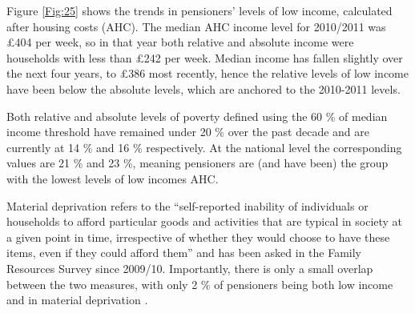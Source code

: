 \documentclass[11 pt, a4paper]{report}
\begin{document}
Figure \ref{Fig:25} shows the trends in pensioners' levels of low income, calculated after housing costs (AHC). The median AHC income level for 2010/2011 was \pounds 404 per week, so in that year both relative and absolute income were households with less than \pounds 242 per week. Median income has fallen slightly over the next four years, to \pounds 386 most recently, hence the relative levels of low income have been below the absolute levels, which are anchored to the 2010-2011 levels. 

Both relative and absolute levels of poverty defined using the 60 \% of median income threshold have remained under 20 \% over the past decade and are currently at 14 \% and 16 \% respectively. At the national level the corresponding values are 21 \% and 23 \%, meaning pensioners are (and have been) the group with the lowest levels of low incomes AHC. 

Material deprivation refers to the ``self-reported inability of individuals or households to afford
particular goods and activities that are typical in society at a given point in
time, irrespective of whether they would choose to have these items, even if
they could afford them'' and has been asked in the Family Resources Survey since 2009/10. Importantly, there is only a small overlap between the two measures, with only 2 \% of pensioners being both low income and in material deprivation \citep[p.70]{DWP2015}.
\end{document}

